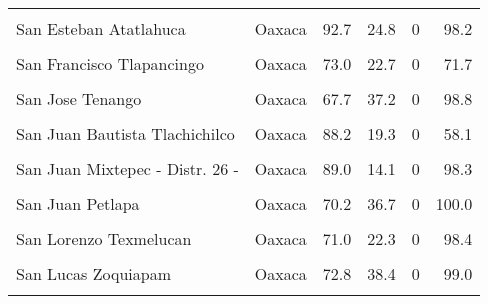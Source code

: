 \documentclass[
]{report}
\begin{document}
\begin{longtable}[t]{llrrrr}
\cellcolor{gray!6}{San Cristobal Amoltepec} & \cellcolor{gray!6}{Oaxaca} & \cellcolor{gray!6}{89.0} & \cellcolor{gray!6}{24.0} & \cellcolor{gray!6}{0} & \cellcolor{gray!6}{99.7}\\
San Esteban Atatlahuca & Oaxaca & 92.7 & 24.8 & 0 & 98.2\\
\cellcolor{gray!6}{San Francisco Cahuacua} & \cellcolor{gray!6}{Oaxaca} & \cellcolor{gray!6}{95.5} & \cellcolor{gray!6}{22.4} & \cellcolor{gray!6}{0} & \cellcolor{gray!6}{61.0}\\
\addlinespace
San Francisco Tlapancingo & Oaxaca & 73.0 & 22.7 & 0 & 71.7\\
\cellcolor{gray!6}{San Jose Lachiguiri} & \cellcolor{gray!6}{Oaxaca} & \cellcolor{gray!6}{68.7} & \cellcolor{gray!6}{12.1} & \cellcolor{gray!6}{0} & \cellcolor{gray!6}{99.7}\\
San Jose Tenango & Oaxaca & 67.7 & 37.2 & 0 & 98.8\\
\cellcolor{gray!6}{San Juan Atepec} & \cellcolor{gray!6}{Oaxaca} & \cellcolor{gray!6}{96.2} & \cellcolor{gray!6}{24.9} & \cellcolor{gray!6}{0} & \cellcolor{gray!6}{96.8}\\
San Juan Bautista Tlachichilco & Oaxaca & 88.2 & 19.3 & 0 & 58.1\\
\addlinespace
\cellcolor{gray!6}{San Juan Diuxi} & \cellcolor{gray!6}{Oaxaca} & \cellcolor{gray!6}{78.2} & \cellcolor{gray!6}{9.3} & \cellcolor{gray!6}{0} & \cellcolor{gray!6}{97.5}\\
San Juan Mixtepec - Distr. 26 - & Oaxaca & 89.0 & 14.1 & 0 & 98.3\\
\cellcolor{gray!6}{San Juan Numi} & \cellcolor{gray!6}{Oaxaca} & \cellcolor{gray!6}{95.3} & \cellcolor{gray!6}{21.2} & \cellcolor{gray!6}{0} & \cellcolor{gray!6}{98.6}\\
San Juan Petlapa & Oaxaca & 70.2 & 36.7 & 0 & 100.0\\
\cellcolor{gray!6}{San Juan Tamazola} & \cellcolor{gray!6}{Oaxaca} & \cellcolor{gray!6}{96.0} & \cellcolor{gray!6}{23.2} & \cellcolor{gray!6}{0} & \cellcolor{gray!6}{96.9}\\
\addlinespace
San Lorenzo Texmelucan & Oaxaca & 71.0 & 22.3 & 0 & 98.4\\
\cellcolor{gray!6}{San Lucas Camotlan} & \cellcolor{gray!6}{Oaxaca} & \cellcolor{gray!6}{76.0} & \cellcolor{gray!6}{20.6} & \cellcolor{gray!6}{0} & \cellcolor{gray!6}{99.6}\\
San Lucas Zoquiapam & Oaxaca & 72.8 & 38.4 & 0 & 99.0\\
\cellcolor{gray!6}{San Martin Itunyoso} & \cellcolor{gray!6}{Oaxaca} & \cellcolor{gray!6}{66.3} & \cellcolor{gray!6}{16.6} & \cellcolor{gray!6}{0} & \cellcolor{gray!6}{99.5}\\

\end{longtable}
\end{document}
